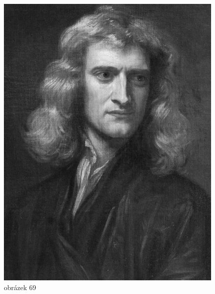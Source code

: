 \documentclass[crop=false]{standalone}
\begin{document}
\begin{figure}[H]
    \includegraphics[width=\linewidth]{images/isaac-newton.jpg}
    \caption{obrázek 69}
  \endminipage
\end{figure}
\end{document}
